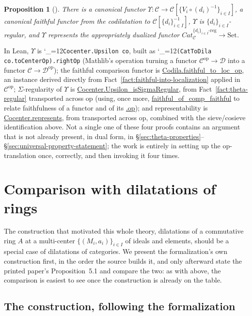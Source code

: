 \documentclass[11pt]{amsart}
\newcommand{\lc}[1]{\url{#1}}
\newcommand{\lcode}{\begingroup\catcode`\_=12\relax\lcodeInner}
\newcommand{\lcodeInner}[1]{\texttt{#1}\endgroup}
\theoremstyle{plain}
\newtheorem{proposition}[theorem]{Proposition}
\theoremstyle{definition}
\theoremstyle{remark}
\newcommand{\calC}{\mathcal C}
\newcommand{\calD}{\mathcal D}
\newcommand{\op}{\ensuremath{\mathrm{op}}}
\begin{document}
\begin{proposition}[{\citep[Proposition~4.5]{Mayeux}}]
There is a canonical functor $\Upsilon : \calC \to \calC[\{V_i\circ(d_i)^{-1}\}_{i\in I}]$,
a canonical faithful functor from the codilatation to $\calC[\{d_i\}_{i\in I}^{-1}]$,
$\Upsilon$ is $\{d_i\}_{i\in I}$-regular, and $\Upsilon$ represents the appropriately dualized
functor $Cat_\calC^{\{d_i\}_{i\in I}\text{-reg}} \to \mathrm{Set}$.
\end{proposition}

In Lean, $\Upsilon$ is \lcode{Cocenter.Upsilon co}, built as \lcode{(CatToDila
co.toCenterOp).rightOp} (Mathlib's operation turning a functor $\calC^{\op} \to \calD$ into a
functor $\calC \to \calD^{\op}$); the faithful comparison functor is
\lc{Codila.faithful_to_loc_op}, an instance derived directly from
Fact~\ref{fact:faithful-into-localization} applied in $\calC^{\op}$; $\Sigma$-regularity of
$\Upsilon$ is \lc{Cocenter.Upsilon_isSigmaRegular}, from Fact~\ref{fact:theta-regular}
transported across $\op$ (using, once more,
\lc{faithful_of_comp_faithful} to relate faithfulness of a functor and of its
\lc{.op}); and representability is \lc{Cocenter.represents}, from
\citep[Proposition~3.12]{Mayeux} transported across $\op$, combined with the sieve/cosieve identification
above. Not a single one of these four proofs contains an argument that is not already present,
in dual form, in \S\ref{sec:theta-properties}--\S\ref{sec:universal-property-statement}; the
work is entirely in setting up the \op-translation once, correctly, and then invoking it four
times.
\section{Comparison with dilatations of rings}
\label{sec:rings}

The construction that motivated this whole theory, dilatations of a commutative ring $A$
at a multi-center $\{(M_i,a_i)\}_{i\in I}$ of ideals and elements, should be a special case
of dilatations of categories. We present the formalization's own construction first, in the
order the source builds it, and only afterward state the printed paper's Proposition~5.1 and
compare the two: as with \citep[Proposition~3.15]{Mayeux} above, the comparison is easiest to
see
once the construction is already on the table.

\subsection{The construction, following the formalization}
\label{sec:rings-construction}
\end{document}
